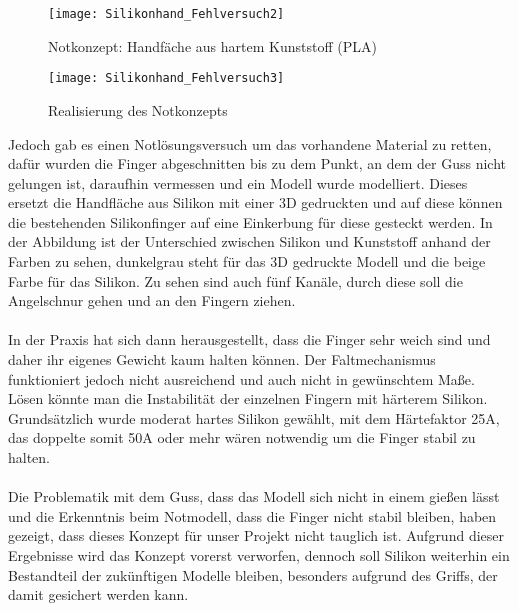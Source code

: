\documentclass[titlepage,12pt,twoside]{article}
\begin{document}
\begin{figure}[H]
	\begin{center}
		\scalebox{0.8}
		{\texttt{[image: Silikonhand\_Fehlversuch2]}}
		\caption{Notkonzept: Handfäche aus hartem Kunststoff (PLA)}
		\label{fig:Silikonhand_Fehlversuch2}			
	\end{center}
\end{figure}
\begin{figure}[H]
	\begin{center}
		\scalebox{0.8}
		{\texttt{[image: Silikonhand\_Fehlversuch3]}}
		\caption{Realisierung des Notkonzepts}
		\label{fig:Silikonhand_Fehlversuch3}			
	\end{center}
\end{figure}
\hfill \break
Jedoch gab es einen Notlösungsversuch um das vorhandene Material zu retten, dafür wurden die Finger abgeschnitten bis zu dem Punkt, an dem der Guss nicht gelungen ist, daraufhin vermessen und ein Modell wurde modelliert. Dieses ersetzt die Handfläche 
aus Silikon mit einer 3D gedruckten und auf diese können die bestehenden Silikonfinger auf eine Einkerbung für diese gesteckt werden. In der Abbildung ist der Unterschied zwischen Silikon und Kunststoff anhand der Farben zu sehen, dunkelgrau steht 
für das 3D gedruckte Modell und die beige Farbe für das Silikon. Zu sehen sind auch fünf Kanäle, durch diese soll die Angelschnur gehen und an den Fingern ziehen. \\
\\
In der Praxis hat sich dann herausgestellt, dass die Finger sehr weich sind und daher ihr eigenes Gewicht kaum halten können. Der Faltmechanismus funktioniert jedoch nicht ausreichend und auch nicht in gewünschtem Maße. Lösen könnte man die 
Instabilität der einzelnen Fingern mit härterem Silikon. Grundsätzlich wurde moderat hartes Silikon gewählt, mit dem Härtefaktor 25A, das doppelte somit 50A oder mehr wären notwendig um die Finger stabil zu halten. \\
\\
Die Problematik mit dem Guss, dass das Modell sich nicht in einem gießen lässt und die Erkenntnis beim Notmodell, dass die Finger nicht stabil bleiben, haben gezeigt, dass dieses Konzept für unser Projekt nicht tauglich ist. Aufgrund dieser 
Ergebnisse wird das Konzept vorerst verworfen, dennoch soll Silikon weiterhin ein Bestandteil der zukünftigen Modelle bleiben, besonders aufgrund des Griffs, der damit gesichert werden kann. \\
\\
\end{document}
